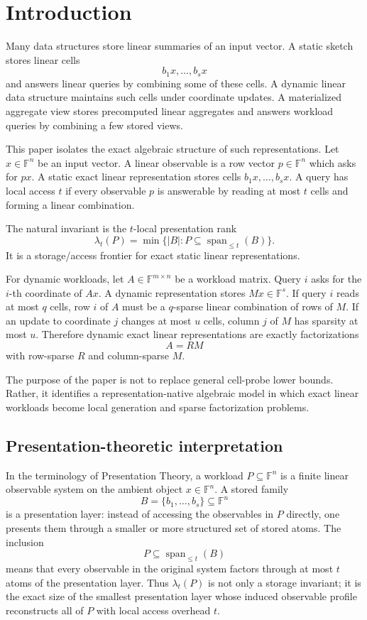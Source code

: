 \documentclass[11pt]{article}
\begin{document}
\section{Introduction}

Many data structures store linear summaries of an input vector. A static sketch stores linear cells
\[
b_1x,\ldots,b_sx
\]
and answers linear queries by combining some of these cells. A dynamic linear data structure maintains such cells under coordinate updates. A materialized aggregate view stores precomputed linear aggregates and answers workload queries by combining a few stored views.

This paper isolates the exact algebraic structure of such representations. Let $x\in\mathbb F^n$ be an input vector. A linear observable is a row vector $p\in\mathbb F^n$ which asks for $px$. A static exact linear representation stores cells $b_1x,\ldots,b_sx$. A query has local access $t$ if every observable $p$ is answerable by reading at most $t$ cells and forming a linear combination.

The natural invariant is the $t$-local presentation rank
\[
\lambda_t(P)
=
\min\{|B|:P\subseteq \operatorname{span}_{\le t}(B)\}.
\]
It is a storage/access frontier for exact static linear representations.

For dynamic workloads, let $A\in\mathbb F^{m\times n}$ be a workload matrix. Query $i$ asks for the $i$-th coordinate of $Ax$. A dynamic representation stores $Mx\in\mathbb F^s$. If query $i$ reads at most $q$ cells, row $i$ of $A$ must be a $q$-sparse linear combination of rows of $M$. If an update to coordinate $j$ changes at most $u$ cells, column $j$ of $M$ has sparsity at most $u$. Therefore dynamic exact linear representations are exactly factorizations
\[
A=RM
\]
with row-sparse $R$ and column-sparse $M$.

The purpose of the paper is not to replace general cell-probe lower bounds. Rather, it identifies a representation-native algebraic model in which exact linear workloads become local generation and sparse factorization problems.

\subsection{Presentation-theoretic interpretation}

In the terminology of Presentation Theory, a workload \(P\subseteq \mathbb F^n\) is a finite linear observable system on the ambient object \(x\in\mathbb F^n\).  A stored family
\[
B=\{b_1,\ldots,b_s\}\subseteq \mathbb F^n
\]
is a presentation layer: instead of accessing the observables in \(P\) directly, one presents them through a smaller or more structured set of stored atoms.  The inclusion
\[
P\subseteq \operatorname{span}_{\le t}(B)
\]
means that every observable in the original system factors through at most \(t\) atoms of the presentation layer.  Thus \(\lambda_t(P)\) is not only a storage invariant; it is the exact size of the smallest presentation layer whose induced observable profile reconstructs all of \(P\) with local access overhead \(t\).
\end{document}
